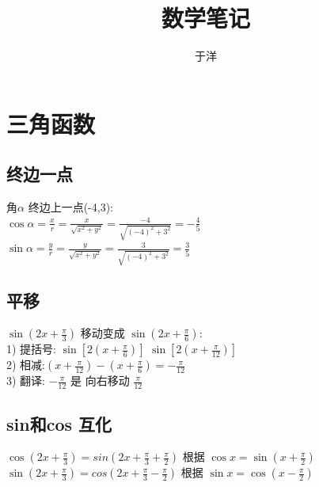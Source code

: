 \documentclass[hyperref, UTF8,11pt,a4paper]{ctexart} %
\title{数学笔记}	%
\author{于洋}			%
\date{}					%
\begin{document}
\maketitle

\newpage

\section{三角函数}

\subsection{终边一点}
{\color{red} 角$\alpha$ 终边上一点(-4,3):} \\
$\cos \alpha=\frac{x}{r}=\frac{x}{\sqrt{x^{2}+y^{2}}}=\frac{-4}{\sqrt{(-4)^{2}+3^{2}}}=-\frac{4}{5}$ \\
$\sin \alpha=\frac{y}{r}=\frac{y}{\sqrt{x^{2}+y^{2}}}=\frac{3}{\sqrt{(-4)^{2}+3^{2}}}=\frac{3}{5}$


\subsection{平移}
{\color{red}  $\sin \left(2 x+\frac{\pi}{3}\right)$ 移动变成 $\sin \left(2 x+\frac{\pi}{6}\right)$:} \\
1) 提括号:	$\sin \left[2\left(x+\frac{\pi}{6}\right)\right]$ \quad $\sin \left[2\left(x+\frac{\pi}{12}\right)\right]$ \\
2) 相减:$\left(x+\frac{\pi}{12}\right)-\left(x+\frac{\pi}{6}\right)=-\frac{\pi}{12}$ \\
3) 翻译: $-\frac{\pi}{12}$ 是 向右移动 $\frac{\pi}{12}$


\subsection {sin和cos 互化}

$\cos \left(2 x+\frac{\pi}{3}\right) = sin\left(2 x+\frac{\pi}{3}+\frac{\pi}{2}\right)$  \quad 根据 $\cos x=\sin \left(x+\frac{\pi}{2}\right)$ \\
$\sin \left(2 x+\frac{\pi}{3}\right) = cos\left(2 x+\frac{\pi}{3}-\frac{\pi}{2}\right)$  \quad 根据 $\sin x=\cos \left(x-\frac{\pi}{2}\right)$
\end{document}
